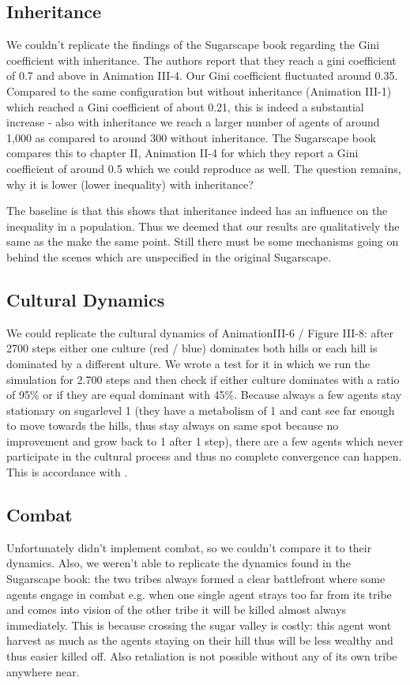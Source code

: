 \subsection{Inheritance}
We couldn't replicate the findings of the Sugarscape book regarding the Gini coefficient with inheritance. The authors report that they reach a gini coefficient of 0.7 and above in Animation III-4. Our Gini coefficient fluctuated around 0.35. Compared to the same configuration but without inheritance (Animation III-1) which reached a Gini coefficient of about 0.21, this is indeed a substantial increase - also with inheritance we reach a larger number of agents of around 1,000 as compared to around 300 without inheritance.
The Sugarscape book compares this to chapter II, Animation II-4 for which they report a Gini coefficient of around 0.5 which we could reproduce as well. The question remains, why it is lower (lower inequality) with inheritance?

The baseline is that this shows that inheritance indeed has an influence on the inequality in a population. Thus we deemed that our results are qualitatively the same as the make the same point. Still there must be some mechanisms going on behind the scenes which are unspecified in the original Sugarscape.

\subsection{Cultural Dynamics}
We could replicate the cultural dynamics of AnimationIII-6 / Figure III-8: after 2700 steps either one culture (red / blue) dominates both hills or each hill is dominated by a different ulture. We wrote a test for it in which we run the simulation for 2.700 steps and then check if either culture dominates with a ratio of 95\% or if they are equal dominant with 45\%. Because always a few agents stay stationary on sugarlevel 1 (they have a metabolism of 1 and cant see far enough to move towards the hills, thus stay always on same spot because no improvement and grow back to 1 after 1 step), there are a few agents which never participate in the cultural process and thus no complete convergence can happen. This is accordance with \cite{weaver_replicating_2009}.

\subsection{Combat}
Unfortunately \cite{weaver_replicating_2009} didn't implement combat, so we couldn't compare it to their dynamics. Also, we weren't able to replicate the dynamics found in the Sugarscape book: the two tribes always formed a clear battlefront where some agents engage in combat e.g. when one single agent strays too far from its tribe and comes into vision of the other tribe it will be killed almost always immediately. This is because crossing the sugar valley is costly: this agent wont harvest as much as the agents staying on their hill thus will be less wealthy and thus easier killed off. Also retaliation is not possible without any of its own tribe anywhere near.

